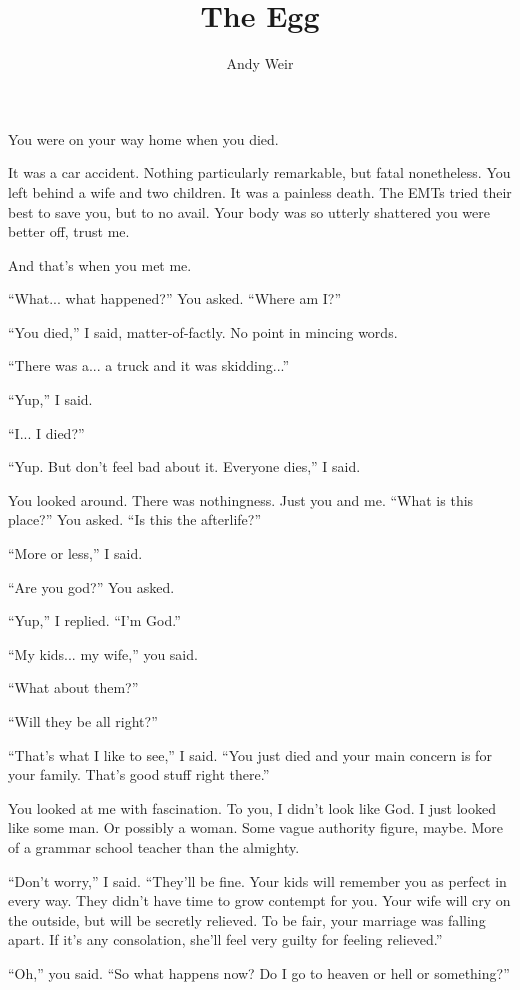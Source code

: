 \documentclass{article}
\title{The Egg}
\author{Andy Weir}
\date{}
\begin{document}
\maketitle

You were on your way home when you died.

It was a car accident. Nothing particularly remarkable, but fatal nonetheless. You left behind a wife and two children. It was a painless death. The EMTs tried their best to save you, but to no avail. Your body was so utterly shattered you were better off, trust me.

And that's when you met me.

“What... what happened?” You asked. “Where am I?”

“You died,” I said, matter-of-factly. No point in mincing words.

“There was a... a truck and it was skidding...”

“Yup,” I said.

“I... I died?”

“Yup. But don't feel bad about it. Everyone dies,” I said.

You looked around. There was nothingness. Just you and me. “What is this place?” You asked. “Is this the afterlife?”

“More or less,” I said.

“Are you god?” You asked.

“Yup,” I replied. “I'm God.”

“My kids... my wife,” you said.

“What about them?”

“Will they be all right?”

“That's what I like to see,” I said. “You just died and your main concern is for your family. That's good stuff right there.”

You looked at me with fascination. To you, I didn't look like God. I just looked like some man. Or possibly a woman. Some vague authority figure, maybe. More of a grammar school teacher than the almighty.

“Don't worry,” I said. “They'll be fine. Your kids will remember you as perfect in every way. They didn't have time to grow contempt for you. Your wife will cry on the outside, but will be secretly relieved. To be fair, your marriage was falling apart. If it's any consolation, she'll feel very guilty for feeling relieved.”

“Oh,” you said. “So what happens now? Do I go to heaven or hell or something?”
\end{document}
